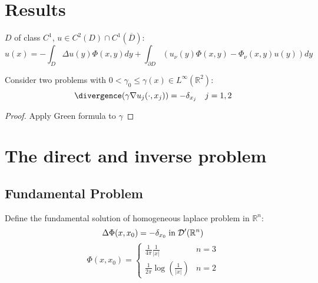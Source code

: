 \section{Results}
\begin{theorem}
 $D$ of class $C^1$, $u\in C^2(D)\cap C^1(\overline{D})$:
 \begin{equation}
  u(x) = -\int_D\Delta u(y) \Phi(x,y) dy + \int_{\partial D}(u_\nu(y)\Phi(x,y)-\Phi_\nu(x,y) u(y)) dy
 \end{equation}
\end{theorem}
\begin{theorem}
 Consider two problems with $0 < \gamma_0 \leq \gamma(x) \in L^\infty(\mathbb{R}^2)$:
 \begin{equation}
  \divergence(\gamma \nabla u_j(\cdot,x_j)) = - \delta_{x_j}\quad j = 1,2
 \end{equation}
\end{theorem}
\begin{proof}
 Apply Green formula to $\gamma$
\end{proof}
\fi


\iffalse
\section{The direct and inverse problem}
\subsection{Fundamental Problem}
\begin{definition}
 Define the fundamental solution of homogeneous laplace problem in $\mathbb{R}^n$:
 \begin{equation}
  \Delta \Phi(x,x_0) = -\delta_{x_0} \;\textup{in}\;\mathcal{D}'(\mathbb{R}^n)
 \end{equation}
 \begin{equation}
  \Phi(x,x_0)=
  \begin{cases}
   \frac{1}{4\pi}\frac{1}{| x |} & n=3 \\
   \frac{1}{2\pi}\log(\frac{1}{|x|}) & n=2
  \end{cases}
 \end{equation}

\end{definition}

